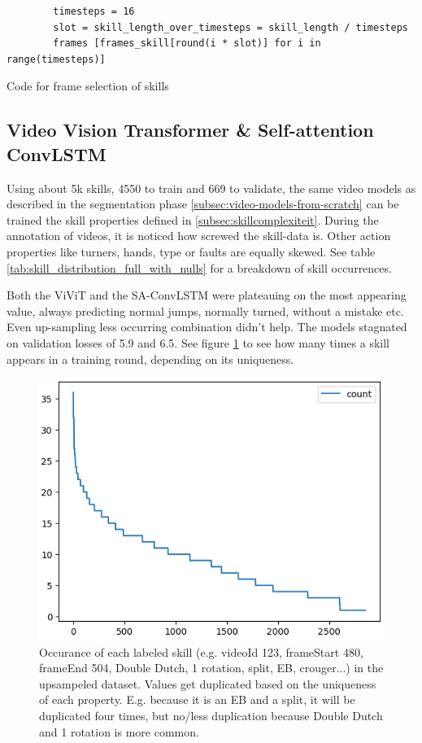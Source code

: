 \begin{listing}
    \begin{verbatim}
        timesteps = 16
        slot = skill_length_over_timesteps = skill_length / timesteps
        frames [frames_skill[round(i * slot)] for i in range(timesteps)]
    \end{verbatim}
    \caption[Code for frame selection skills]{Code for frame selection of skills}
    \label{code:skill-frame-selection}
\end{listing}



\subsection{Video Vision Transformer \& Self-attention ConvLSTM}

Using about 5k skills, 4550 to train and 669 to validate, the same video models as described in the segmentation phase \ref{subsec:video-models-from-scratch} can be trained the skill properties defined in \ref{subsec:skillcomplexiteit}.
During the annotation of videos, it is noticed how screwed the skill-data is. Other action properties like turners, hands, type or faults are equally skewed. See table \ref{tab:skill_distribution_full_with_nulls} for a breakdown of skill occurrences.

Both the ViViT and the SA-ConvLSTM were plateauing on the most appearing value, always predicting normal jumps, normally turned, without a mistake etc.
Even up-sampling less occurring combination didn't help. The models stagnated on validation losses of 5.9 and 6.5. See figure \ref{fig:skill-upsampling-distribution} to see how many times a skill appears in a training round, depending on its uniqueness.

\begin{figure}
    \centering
    \includegraphics[width=0.7\linewidth]{img/skill-upsampling-distribution}
    \caption[upsampling distribution of skills]{Occurance of each labeled skill (e.g. videoId 123, frameStart 480, frameEnd 504, Double Dutch, 1 rotation, split, EB, crouger...) in the upsampeled dataset. Values get duplicated based on the uniqueness of each property. E.g. because it is an EB and a split, it will be duplicated four times, but no/less duplication because Double Dutch and 1 rotation is more common.}
    \label{fig:skill-upsampling-distribution}
\end{figure}

